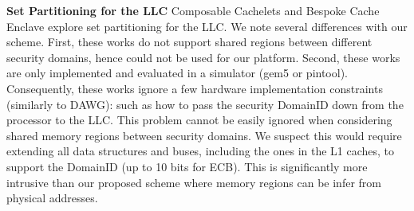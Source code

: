 \noindent\textbf{Set Partitioning for the LLC}
Composable Cachelets\cite{townley2022composable} and Bespoke Cache Enclave\cite{saileshwar2021bespoke} explore set partitioning for the LLC. We note several differences with our scheme. First, these works do not support shared regions between different security domains, hence could not be used for our platform. Second, these works are only implemented and evaluated in a simulator (gem5 or pintool). Consequently, these works ignore a few hardware implementation constraints (similarly to  DAWG\cite{kiriansky2018dawg}): such as how to pass the security DomainID down from the processor to the LLC. This problem cannot be easily ignored when considering shared memory regions between security domains. We suspect this would require extending all data structures and buses, including the ones in the L1 caches, to support the DomainID (up to 10 bits for ECB). 
This is significantly more intrusive than our proposed scheme where memory regions can be infer from physical addresses.